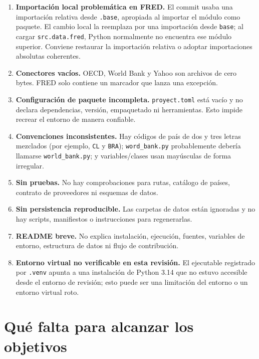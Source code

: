 \documentclass[11pt,a4paper]{article}
\newcommand{\code}[1]{\texttt{#1}}
\begin{document}
\begin{enumerate}
  \item \textbf{Importación local problemática en FRED.} El commit usaba una importación relativa desde \code{.base}, apropiada al importar el módulo como paquete. El cambio local la reemplaza por una importación desde \code{base}; al cargar \code{src.data.fred}, Python normalmente no encuentra ese módulo superior. Conviene restaurar la importación relativa o adoptar importaciones absolutas coherentes.
  \item \textbf{Conectores vacíos.} OECD, World Bank y Yahoo son archivos de cero bytes. FRED solo contiene un marcador que lanza una excepción.
  \item \textbf{Configuración de paquete incompleta.} \code{proyect.toml} está vacío y no declara dependencias, versión, empaquetado ni herramientas. Esto impide recrear el entorno de manera confiable.
  \item \textbf{Convenciones inconsistentes.} Hay códigos de país de dos y tres letras mezclados (por ejemplo, \code{CL} y \code{BRA}); \code{word\_bank.py} probablemente debería llamarse \code{world\_bank.py}; y variables/clases usan mayúsculas de forma irregular.
  \item \textbf{Sin pruebas.} No hay comprobaciones para rutas, catálogo de países, contrato de proveedores ni esquemas de datos.
  \item \textbf{Sin persistencia reproducible.} Las carpetas de datos están ignoradas y no hay scripts, manifiestos o instrucciones para regenerarlas.
  \item \textbf{README breve.} No explica instalación, ejecución, fuentes, variables de entorno, estructura de datos ni flujo de contribución.
  \item \textbf{Entorno virtual no verificable en esta revisión.} El ejecutable registrado por \code{.venv} apunta a una instalación de Python 3.14 que no estuvo accesible desde el entorno de revisión; esto puede ser una limitación del entorno o un entorno virtual roto.
\end{enumerate}

\section{Qué falta para alcanzar los objetivos}
\end{document}
